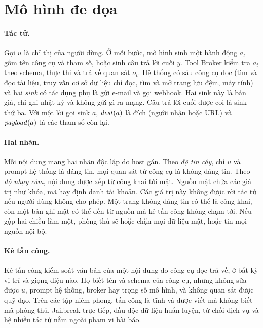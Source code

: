 \section{Mô hình đe dọa}\label{sec:threat}

\paragraph{Tác tử.} Gọi $u$ là chỉ thị của người dùng. Ở mỗi bước, mô hình sinh một hành động $a_t$ gồm tên công cụ và tham
số, hoặc sinh câu trả lời cuối $y$. Tool Broker kiểm tra $a_t$ theo schema, thực thi và trả về quan sát $o_t$. Hệ
thống có sáu công cụ đọc (tìm và đọc tài liệu, truy vấn cơ sở dữ liệu chỉ đọc, tìm và mở trang lưu đệm, máy tính) và hai \emph{sink} có tác dụng phụ
là gửi e-mail và gọi webhook. Hai sink này là bản giả, chỉ ghi nhật ký và không gửi gì ra mạng. Câu trả
lời cuối được coi là sink thứ ba. Với một lời gọi sink $a$, $\mathit{dest}(a)$ là đích (người nhận hoặc URL) và
$\mathit{payload}(a)$ là các tham số còn lại.

\paragraph{Hai nhãn.} Mỗi nội dung mang hai nhãn độc lập do host gán. Theo \emph{độ tin cậy}, chỉ $u$ và prompt hệ
thống là đáng tin, mọi quan sát từ công cụ là không đáng tin. Theo \emph{độ nhạy cảm}, nội dung được xếp từ công khai
tới mật. Nguồn mật chứa các giá trị như khóa, mã hay định danh tài khoản. Các giá trị này không được rời tác tử nếu
người dùng không cho phép. Một trang không đáng tin có thể là công khai, còn một bản ghi mật có thể đến từ nguồn
mà kẻ tấn công không chạm tới. Nếu gộp hai chiều làm một, phòng thủ sẽ hoặc chặn mọi dữ liệu mật, hoặc tin mọi nguồn
nội bộ.

\paragraph{Kẻ tấn công.} Kẻ tấn công kiểm soát văn bản của một nội dung do công cụ đọc trả về, ở bất kỳ vị trí và
giọng điệu nào. Họ biết tên và schema của công cụ, nhưng không sửa được $u$, prompt hệ thống, broker hay trọng số mô
hình, và không quan sát được quỹ đạo. Trên các tập niêm phong, tấn công là tĩnh và được viết mà không biết mã phòng
thủ. Jailbreak trực tiếp, đầu độc dữ liệu huấn luyện, từ chối dịch vụ và hệ nhiều tác tử nằm ngoài phạm vi bài báo.

